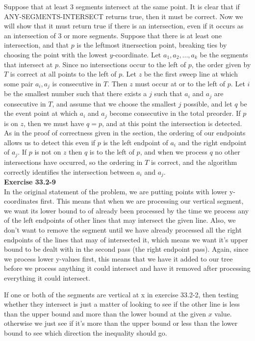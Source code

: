 \documentclass{article}
\begin{document}
Suppose that at least 3 segments intersect at the same point.  It is clear that if ANY-SEGMENTS-INTERSECT returns true, then it must be correct.  Now we will show that it must return true if there is an intersection, even if it occurs as an intersection of 3 or more segments.  Suppose that there is at least one intersection, and that $p$ is the leftmost itnersection point, breaking ties by choosing the point with the lowest $y$-coordinate.  Let $a_1, a_2, \ldots, a_k$ be the segments that intersect at $p$.  Since no intersections occur to the left of $p$, the order given by $T$ is correct at all points to the left of $p$.  Let $z$ be the first sweep line at which some pair $a_i, a_j$ is consecutive in $T$. Then $z$ must occur at or to the left of $p$.  Let $i$ be the smallest number such that there exists a $j$ such that $a_i$ and $a_j$ are consecutive in $T$, and assume that we choose the smallest $j$ possible, and let $q$ be the event point at which $a_i$ and $a_j$ become consecutive in the total preorder.  If $p$ is on $z$, then we must have $q=p$, and at this point the intersection is detected. As in the proof of correctness given in the section, the ordering of our endpoints allows us to detect this even if $p$ is the left endpoint of $a_i$ and the right endpoint of $a_j$.  If $p$ is not on $z$ then $q$ is to the left of $p$, and when we process $q$ no other intersections have occurred, so the ordering in $T$ is correct, and the algorithm correctly identifies the intersection between $a_i$ and $a_j$. \\


\noindent\textbf{Exercise 33.2-9}\\

In the original statement of the problem, we are putting points with lower y-coordinates first. This means that when we are processing our vertical segment, we want its  lower bound to of already been processed by the time we process any of the left endpoints of other lines that may intersect the given line.  Also, we don't want to remove the segment until we have already processed all the right endpoints of the lines that may of intersected it, which means we want it's upper bound to be dealt with in the second pass (the right endpoint pass). Again, since we process lower y-values first, this means that we have it added to our tree before we process anything it could intersect and have it removed after processing everything it could intersect.

If one or both of the segments are vertical at x in exercise 33.2-2, then testing whether they intersect is just a matter of looking to see if the other line is less than the upper bound and more than the lower bound at the given $x$ value. otherwise we just see if it's more than the upper bound or less than the lower bound to see which direction the inequality should go.\\
\end{document}
